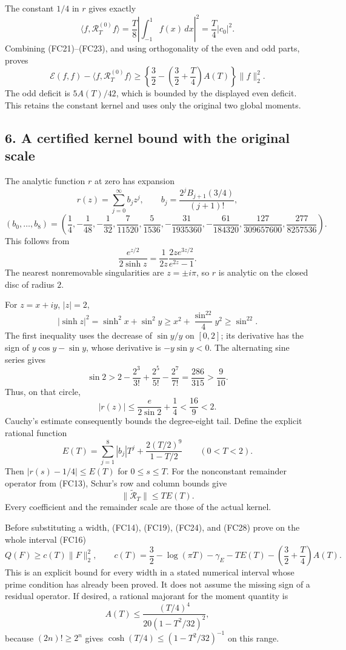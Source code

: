 \documentclass[
  10pt,
  a4paper,
]{article}
\begin{document}
The constant \(1/4\) in \(r\) gives exactly \[
\langle f,\mathcal R_T^{(0)}f\rangle
=\frac T8\left|\int_{-1}^1f(x)\,dx\right|^2
=\frac T4|c_0|^2.
\tag{FC23}
\] Combining (FC21)--(FC23), and using orthogonality of the even and odd
parts, proves \[
\mathcal E(f,f)-\langle f,\mathcal R_T^{(0)}f\rangle
\ge
\left\{\frac32-\left(\frac32+\frac T4\right)A(T)\right\}\|f\|_2^2.
\tag{FC24}
\] The odd deficit is \(5A(T)/42\), which is bounded by the displayed
even deficit. This retains the constant kernel and uses only the
original two global moments.

\subsection{6. A certified kernel bound with the original
scale}\label{a-certified-kernel-bound-with-the-original-scale}

The analytic function \(r\) at zero has expansion \[
r(z)=\sum_{j=0}^\infty b_jz^j,\qquad
b_j=\frac{2^jB_{j+1}(3/4)}{(j+1)!},
\] \[
(b_0,\ldots,b_8)=
\left(\frac14,-\frac1{48},-\frac1{32},
\frac7{11520},\frac5{1536},-\frac{31}{1935360},
-\frac{61}{184320},\frac{127}{309657600},
\frac{277}{8257536}\right).
\tag{FC25}
\] This follows from \[
\frac{e^{z/2}}{2\sinh z}
=\frac1{2z}\frac{2ze^{3z/2}}{e^{2z}-1}.
\] The nearest nonremovable singularities are \(z=\pm i\pi\), so \(r\)
is analytic on the closed disc of radius \(2\).

For \(z=x+iy\), \(|z|=2\), \[
|\sinh z|^2=\sinh^2x+\sin^2y
\ge x^2+\frac{\sin^22}{4}y^2\ge\sin^22.
\] The first inequality uses the decrease of \(\sin y/y\) on \([0,2]\);
its derivative has the sign of \(y\cos y-\sin y\), whose derivative is
\(-y\sin y<0\). The alternating sine series gives \[
\sin2>2-\frac{2^3}{3!}+\frac{2^5}{5!}-\frac{2^7}{7!}
=\frac{286}{315}>\frac9{10}.
\] Thus, on that circle, \[
|r(z)|\le\frac e{2\sin2}+\frac14
<\frac{16}{9}<2.
\tag{FC26}
\] Cauchy's estimate consequently bounds the degree-eight tail. Define
the explicit rational function \[
E(T)=\sum_{j=1}^8|b_j|T^j+
\frac{2(T/2)^9}{1-T/2}\qquad(0<T<2).
\tag{FC27}
\] Then \(|r(s)-1/4|\le E(T)\) for \(0\le s\le T\). For the nonconstant
remainder operator from (FC13), Schur's row and column bounds give \[
\|\widetilde{\mathcal R}_T\|\le T E(T).
\tag{FC28}
\] Every coefficient and the remainder scale are those of the actual
kernel.

Before substituting a width, (FC14), (FC19), (FC24), and (FC28) prove on
the whole interval (FC16) \[
\boxed{
Q(F)\ge c(T)\|F\|_2^2,\qquad
c(T)=\frac32-\log(\pi T)-\gamma_E
-T E(T)-\left(\frac32+\frac T4\right)A(T).
}
\tag{FC29}
\] This is an explicit bound for every width in a stated numerical
interval whose prime condition has already been proved. It does not
assume the missing sign of a residual operator. If desired, a rational
majorant for the moment quantity is \[
A(T)\le
\frac{(T/4)^4}{20(1-T^2/32)^2},
\] because \((2n)!\ge2^n\) gives \(\cosh(T/4)\le(1-T^2/32)^{-1}\) on
this range.
\end{document}
